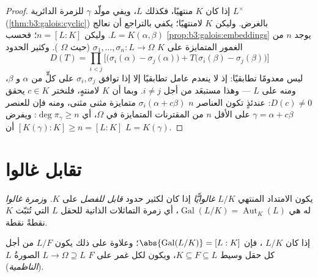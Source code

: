 \begin{proof}
إذا كان $K$ منتهيًا، فكذلك $L$، ويفي مولّد $\gamma$ للزمرة
الدائرية $L^\times$ (\cref{thm:b3:galois:cyclic}) بالغرض. وليكن $K$ لامنتهيًا؛
يكفي بالتراجع أن نعالج $L =
K(\alpha, \beta)$. وليكن $n = [L:K]$؛ فحسب
\cref{prop:b3:galois:embeddings} يوجد $n$ من الغمور المتمايزة على $K$ $\sigma_1, \dots, \sigma_n \colon L \to \Omega$
(حيث $\Omega$ ). وكثير الحدود
\[
D(T)=\prod_{i<j}\bigl[\bigl(\sigma_i(\alpha)-\sigma_j(\alpha)
\bigr) + T\bigl(\sigma_i(\beta) - \sigma_j(\beta)\bigr)\bigr]
\]
ليس معدومًا تطابقيًا: إذ لا ينعدم عامل تطابقيًا إلا إذا توافق
$\sigma_i, \sigma_j$ على كلٍّ من $\alpha$ و $\beta$، ومنه على $L$ --- وهذا
مستبعَد من أجل $i \neq j$. وبما أن $K$ لامنتهٍ، فلنختر $c \in
K$
يحقق $D(c) \ne 0$: عندئذٍ تكون العناصر $n$ $\sigma_i(\alpha +
c\beta)$ متمايزة مثنى
مثنى، ومنه فإن للعنصر $\gamma = \alpha + c\beta$ على الأقل $n$ من المقترنات المتمايزة
في $\Omega$، أي $\deg \pi_\gamma \geq n$: ويفرض $[K(\gamma):K] \geq n = [L:K]$ أن $L = K(\gamma)$.
\end{proof}

\section{تقابل غالوا}

\begin{definition}\label{def:b3:galois:galois}
يكون الامتداد المنتهي $L/K$ \emph{غالوايًّا}
إذا كان  لكثير حدود \emph{قابل للفصل} على $K$.
و\emph{زمرة غالوا} له هي $\operatorname{Gal}(L/K) = \operatorname{Aut}_K(L)$، أي زمرة
التماثلات الذاتية للحقل $L$ التي تُثبّت $K$ نقطةً نقطة.
\end{definition}

\begin{proposition}\label{prop:b3:galois:galoisorder}
إذا كان $L/K$ ، فإن $\abs{\operatorname{Gal}(L/K)} =
[L:K]$؛ وعلاوة على ذلك يكون $L/F$
 من أجل كل حقل وسيط $K
\subseteq F \subseteq L$، ويكون لكل غمر على $F$
$L \to \Omega
\supseteq L$ الصورةُ $L$ (\emph{الناظمية}).
\end{proposition}


